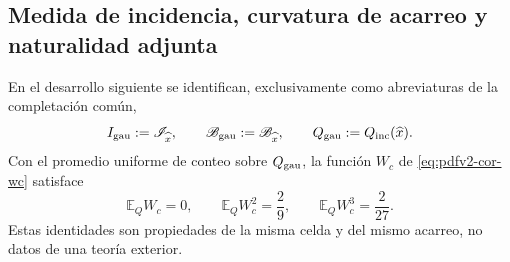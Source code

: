 \subsection{Medida de incidencia, curvatura de acarreo y naturalidad adjunta}
En el desarrollo siguiente se identifican, exclusivamente como abreviaturas
de la completación común,
\[
 I_{\rm gau}:=\mathscr I_{\widehat x},\qquad
 \mathscr B_{\rm gau}:=\mathscr B_{\widehat x},\qquad
 Q_{\rm gau}:=Q_{\rm inc}(\widehat x).
\]
Con el promedio uniforme de conteo sobre \(Q_{\rm gau}\), la función
\(W_c\) de \eqref{eq:pdfv2-cor-wc} satisface
\begin{equation}
\label{eq:pdfv2-cor-wc-momentos}
 \mathbb E_QW_c=0,\qquad
 \mathbb E_QW_c^2=\frac29,\qquad
 \mathbb E_QW_c^3=\frac{2}{27}.
\end{equation}
Estas identidades son propiedades de la misma celda y del mismo acarreo, no
datos de una teoría exterior.
\begingroup
  \let\section\subsection
  
\endgroup


